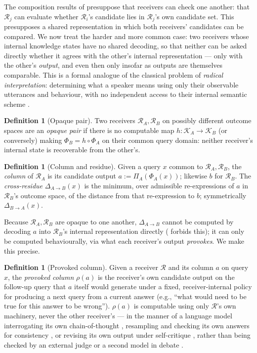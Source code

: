 \documentclass[11pt,twocolumn,a4paper]{article}
\theoremstyle{rdm}
\theoremstyle{definition}
\newtheorem{definition}[theorem]{Definition}
\theoremstyle{remark}
\newcommand{\Rec}{\mathcal{R}}
\newcommand{\Know}{\mathcal{K}}
\newcommand{\dem}{\Delta}
\begin{document}
The composition results of  presuppose that receivers can
check one another: that $\Rec_j$ can evaluate whether $\Rec_i$'s candidate
lies in $\Rec_j$'s own candidate set. This presupposes a shared
representation in which both receivers' candidates can be compared. We now
treat the harder and more common case: two receivers whose internal
knowledge states have no shared decoding, so that neither can be asked
directly whether it agrees with the other's internal representation ---
only with the other's \emph{output}, and even then only insofar as outputs
are themselves comparable. This is a formal analogue of the classical
problem of \emph{radical interpretation}: determining what a speaker means
using only their observable utterances and behaviour, with no independent
access to their internal semantic scheme
\citep{quine1960,davidson1973,grice1975}.

\begin{definition}[Opaque pair]
\label{def:opaque}
Two receivers $\Rec_A,\Rec_B$ on possibly different outcome spaces are an
\emph{opaque pair} if there is no computable map
$h:\Know_A\to\Know_B$ (or conversely) making $\Phi_B = h\circ\Phi_A$ on their
common query domain: neither receiver's internal state is recoverable from
the other's.
\end{definition}

\begin{definition}[Column and residue]
\label{def:column}
Given a query $x$ common to $\Rec_A,\Rec_B$, the \emph{column} of $\Rec_A$ is
its candidate output $a := \Pi_A(\Phi_A(x))$; likewise $b$ for $\Rec_B$. The
\emph{cross-residue} $\dem_{A\to B}(x)$ is the minimum, over admissible
re-expressions of $a$ in $\Rec_B$'s outcome space, of the distance from that
re-expression to $b$; symmetrically $\dem_{B\to A}(x)$.
\end{definition}

Because $\Rec_A,\Rec_B$ are opaque to one another, $\dem_{A\to B}$ cannot be
computed by decoding $a$ into $\Rec_B$'s internal representation directly
( forbids this); it can only be computed behaviourally,
via what each receiver's output \emph{provokes}. We make this precise.

\begin{definition}[Provoked column]
\label{def:provoked}
Given a receiver $\Rec$ and its column $a$ on query $x$, the \emph{provoked
column} $\rho(a)$ is the receiver's own candidate output on the follow-up
query that $a$ itself would generate under a fixed, receiver-internal
policy for producing a next query from a current answer (e.g., ``what
would need to be true for this answer to be wrong''). $\rho(a)$ is
computable using only $\Rec$'s own machinery, never the other receiver's ---
in the manner of a language model interrogating its own chain-of-thought
\citep{wei2022chain}, resampling and checking its own answers for
consistency \citep{wang2022selfconsistency}, or revising its own output
under self-critique \citep{madaan2023selfrefine}, rather than being checked
by an external judge \citep{zheng2023judging} or a second model in debate
\citep{duimproving2023}.
\end{definition}
\end{document}
